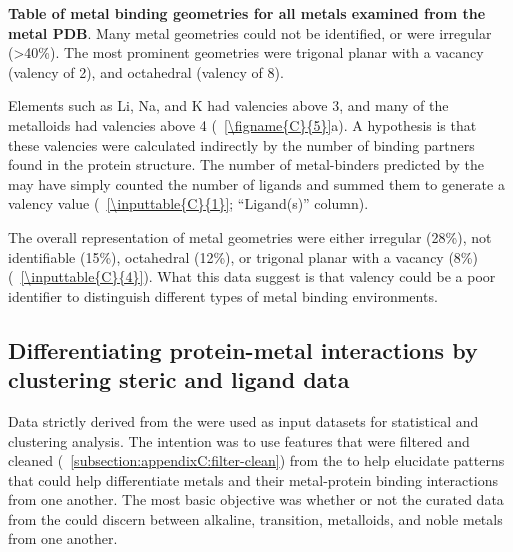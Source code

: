 \documentclass[../main/main]{subfiles}
\begin{document}
\begin{table}[H]
\setlength\extrarowheight{-5pt}
\centering
	\resizebox{\columnwidth}{!}{%
		
	}
	\caption[Table of metal binding geometries for all metals examined from the metal PDB]
	{
		\textbf{Table of metal binding geometries for all metals examined from the metal PDB}.
		Many metal geometries could not be identified, or were irregular (>40\%). The most prominent geometries were trigonal planar with a vacancy (valency of 2), and octahedral (valency of 8).
	}
	\label{\inputtable{C}{4}}
\end{table}

\noindent Elements such as Li, Na, and K had valencies above 3, and many of the metalloids had valencies above 4 (\FIGURE~\ref{\figname{C}{5}}a). A hypothesis is that these valencies were calculated indirectly by the number of binding partners found in the protein structure. The number of metal-binders predicted by the \mPDB{} may have simply counted the number of ligands and summed them to generate a valency value (\TABLE~\ref{\inputtable{C}{1}}; ``Ligand(s)'' column).

The overall representation of metal geometries were either irregular (28\%), not identifiable (15\%), octahedral (12\%), or trigonal planar with a vacancy (8\%) (\TABLE~\ref{\inputtable{C}{4}}). What this data suggest is that valency could be a poor identifier to distinguish different types of metal binding environments.

\subsection{Differentiating protein-metal interactions by clustering steric and ligand data}
Data strictly derived from the \mPDB{} were used as input datasets for statistical and clustering analysis. The intention was to use features that were filtered and cleaned (\SECTION~\ref{subsection:appendixC:filter-clean}) from the \mPDB{} to help elucidate patterns that could help differentiate metals and their metal-protein binding interactions from one another. The most basic objective was whether or not the curated data from the \mPDB{} could discern between alkaline, transition, metalloids, and noble metals from one another.
\end{document}
